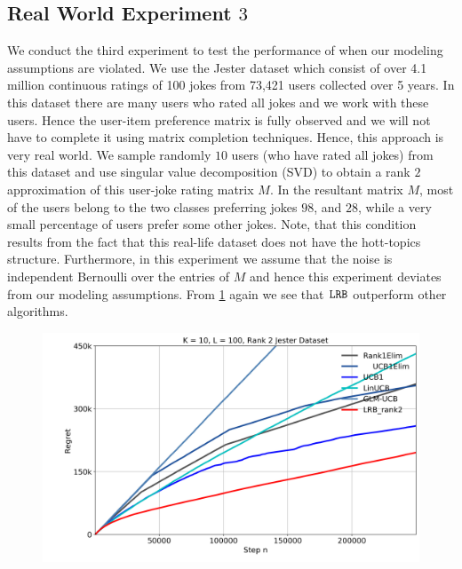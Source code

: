 \subsection{Real World Experiment $3$}
We conduct the third experiment to test the performance of \latentranker when our modeling assumptions are violated. We use the Jester dataset \citep{goldberg2001eigentaste} which consist of over 4.1 million continuous ratings of 100 jokes from 73,421 users collected over 5 years. In this dataset there are many users who rated all jokes and we work with these users. Hence the user-item preference matrix is fully observed and we will not have to complete it using matrix completion techniques. Hence, this approach is very real world. We sample randomly $10$ users (who have rated all jokes) from this dataset and use singular value decomposition (SVD) to obtain a rank $2$ approximation of this user-joke rating matrix $M$. In the resultant matrix $M$, most of the users belong to the two classes preferring jokes $98$, and $28$, while a very small percentage of users prefer some other jokes. Note, that this condition results from the fact that this real-life dataset does not have the hott-topics structure. Furthermore, in this experiment we assume that the noise is independent Bernoulli over the entries of $M$ and hence this experiment deviates from our modeling assumptions. From \ref{fig:6} again we see that ${\tt LRB}$ outperform other algorithms. 
\begin{figure}
    {
    		\includegraphics[scale=0.13]{img/Figure_J_1.png}
  		\label{fig:6}
    }
\end{figure}

